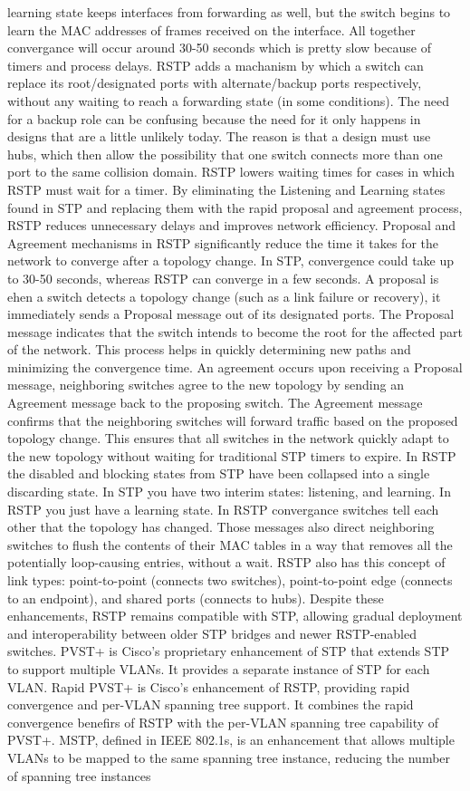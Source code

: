 \documentclass{article}
\begin{document}
\begin{itemize}
learning state keeps interfaces from forwarding as well, but the switch begins to learn the MAC addresses of frames received on the interface. All together convergance will occur around 30-50 seconds which is pretty slow because of timers and process delays. RSTP adds a machanism by which a switch can replace its root/designated ports with alternate/backup ports respectively, without any waiting to reach a forwarding state (in some conditions). The need for a backup role can be confusing because the need for it only happens in designs that are a little unlikely today. The reason is that a design must use hubs, which then allow the possibility that one switch connects more than one port to the same collision domain. RSTP lowers waiting times for cases in which RSTP must wait for a timer. By eliminating the Listening and Learning states found in STP and replacing them with the rapid proposal and agreement process, RSTP reduces unnecessary delays and improves network efficiency. Proposal and Agreement mechanisms in RSTP significantly reduce the time it takes for the network to converge after a topology change. In STP, convergence could take up to 30-50 seconds, whereas RSTP can converge in a few seconds. A proposal is ehen a switch detects a topology change (such as a link failure or recovery), it immediately sends a Proposal message out of its designated ports. The Proposal message indicates that the switch intends to become the root for the affected part of the network. This process helps in quickly determining new paths and minimizing the convergence time. An agreement occurs upon receiving a Proposal message, neighboring switches agree to the new topology by sending an Agreement message back to the proposing switch. The Agreement message confirms that the neighboring switches will forward traffic based on the proposed topology change. This ensures that all switches in the network quickly adapt to the new topology without waiting for traditional STP timers to expire. In RSTP the disabled and blocking states from STP have been collapsed into a single discarding state. In STP you have two interim states: listening, and learning. In RSTP you just have a learning state. In RSTP convergance switches tell each other that the topology has changed. Those messages also direct neighboring switches to flush the contents of their MAC tables in a way that removes all the potentially loop-causing entries, without a wait. RSTP also has this concept of link types: point-to-point (connects two switches), point-to-point edge (connects to an endpoint), and shared ports (connects to hubs). Despite these enhancements, RSTP remains compatible with STP, allowing gradual deployment and interoperability between older STP bridges and newer RSTP-enabled switches. PVST+ is Cisco's proprietary enhancement of STP that extends STP to support multiple VLANs. It provides a separate instance of STP for each VLAN. Rapid PVST+ is Cisco's enhancement of RSTP, providing rapid convergence and per-VLAN spanning tree support. It combines the rapid convergence benefirs of RSTP with the per-VLAN spanning tree capability of PVST+. MSTP, defined in IEEE 802.1s, is an enhancement that allows multiple VLANs to be mapped to the same spanning tree instance, reducing the number of spanning tree instances 
\end{itemize}
\end{document}
